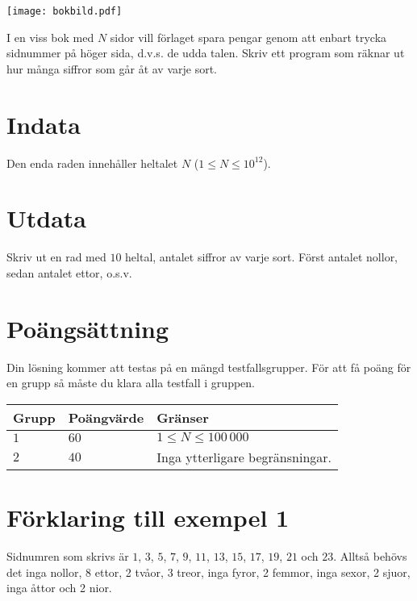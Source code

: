 
\begin{center}
\texttt{[image: bokbild.pdf]}
\end{center}
 
I en viss bok med $N$ sidor vill förlaget spara pengar genom att enbart trycka
sidnummer på höger sida, d.v.s. de udda talen. Skriv ett program som
räknar ut hur många siffror som går åt av varje sort.

\section*{Indata}
Den enda raden innehåller heltalet $N$ ($1 \leq N \leq 10^{12}$).

\section*{Utdata}
Skriv ut en rad med $10$ heltal, antalet siffror av varje sort. Först antalet nollor, sedan antalet ettor, o.s.v.


\section*{Poängsättning}
Din lösning kommer att testas på en mängd testfallsgrupper.
För att få poäng för en grupp så måste du klara alla testfall i gruppen.

\noindent
\begin{tabular}{| l | l | l |}
\hline
  Grupp & Poängvärde & Gränser \\ \hline
  $1$    & $60$       &  $1 \le N \le 100\,000$   \\ \hline 
  $2$    & $40$       &  Inga ytterligare begränsningar. \\ \hline
\end{tabular}


\section*{Förklaring till exempel 1}

Sidnumren som skrivs är $1$, $3$, $5$, $7$, $9$, $11$, $13$, $15$,
$17$, $19$, $21$ och $23$. Alltså behövs det inga nollor, 8 ettor, 2 tvåor, 3
treor, inga fyror, 2 femmor, inga sexor, 2 sjuor, inga åttor och 2 nior.


